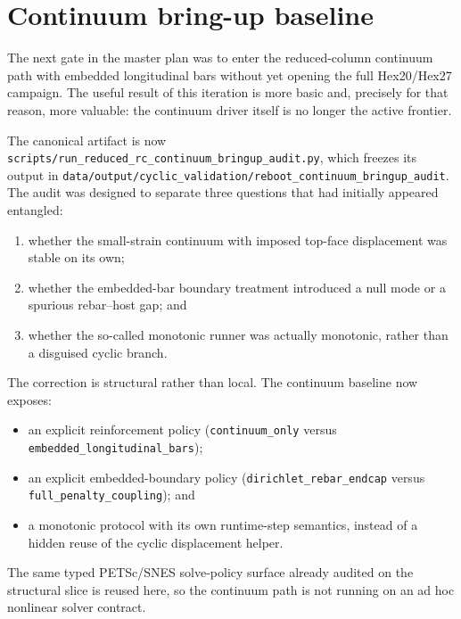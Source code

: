 \section{Continuum bring-up baseline}

The next gate in the master plan was to enter the reduced-column continuum path
with embedded longitudinal bars without yet opening the full Hex20/Hex27
campaign. The useful result of this iteration is more basic and, precisely for
that reason, more valuable: the continuum driver itself is no longer the active
frontier.

The canonical artifact is now
\texttt{scripts/run\_reduced\_rc\_continuum\_bringup\_audit.py}, which freezes
its output in
\texttt{data/output/cyclic\_validation/reboot\_continuum\_bringup\_audit}. The
audit was designed to separate three questions that had initially appeared
entangled:
\begin{enumerate}
  \item whether the small-strain continuum with imposed top-face displacement
    was stable on its own;
  \item whether the embedded-bar boundary treatment introduced a null mode or a
    spurious rebar--host gap; and
  \item whether the so-called monotonic runner was actually monotonic, rather
    than a disguised cyclic branch.
\end{enumerate}

The correction is structural rather than local. The continuum baseline now
exposes:
\begin{itemize}
  \item an explicit reinforcement policy
    (\texttt{continuum\_only} versus
    \texttt{embedded\_longitudinal\_bars});
  \item an explicit embedded-boundary policy
    (\texttt{dirichlet\_rebar\_endcap} versus
    \texttt{full\_penalty\_coupling}); and
  \item a monotonic protocol with its own runtime-step semantics, instead of a
    hidden reuse of the cyclic displacement helper.
\end{itemize}
The same typed PETSc/SNES solve-policy surface already audited on the
structural slice is reused here, so the continuum path is not running on an ad
hoc nonlinear solver contract.

